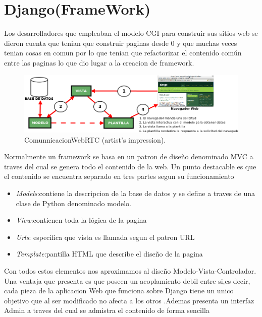 \section{Django(FrameWork)}
Los desarrolladores que empleaban el modelo CGI para construir sus sitios web se dieron cuenta que tenian que construir paginas desde 0 y que muchas veces tenian cosas en comun por lo que tenian que refactorizar el contenido común entre las paginas lo que dio lugar a la creacion de framework.
\begin{figure}[!h]
\centering
\includegraphics[width=0.8\linewidth]{Figures/esquemaDjango}
\decoRule
\caption[An Electron]{ComunnicacionWebRTC (artist's impression).}
\label{fig:ComunnicacionWebRTC}
\end{figure}
Normalmente un framework se basa en un patron de diseño denominado MVC a traves del cual se genera todo el contenido de la web. Un punto destacable es que el contenido se encuentra separado en tres partes segun su funcionamiento
\begin{itemize}
\item \textit{Models}:contiene  la descripcion de la base de datos y se define a traves de una clase de Python denominado  modelo.
\item \textit{View}:contienen toda la lógica de la pagina
\item \textit{Urls}: especifica que vista es llamada segun el patron URL
\item \textit{Template}:pantilla HTML que describe el diseño de la pagina
\end{itemize}
Con todos estos elementos nos aproximamos al diseño Modelo-Vista-Controlador. Una ventaja que presenta  es que poseen un acoplamiento debil entre si,es decir, cada pieza de la aplicacion Web que funciona sobre Django tiene un unico objetivo que al ser modificado no afecta a los otros .Ademas presenta un interfaz Admin a traves del cual se admistra el contenido de forma sencilla
